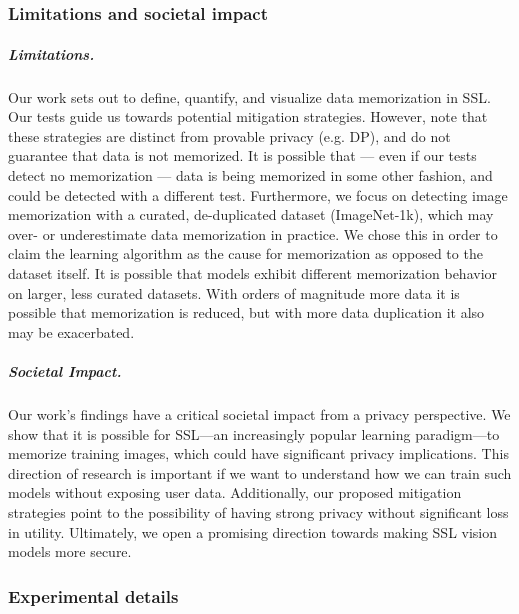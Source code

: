 \graphicspath{{./chapters/chapter1/}}
\chapter{ }
\subsection{Limitations and societal impact}
\paragraph{Limitations. }
Our work sets out to define, quantify, and visualize data memorization in SSL. Our tests guide us towards potential mitigation strategies. However, note that these strategies are distinct from provable privacy (e.g. DP), and do not guarantee that data is not memorized. It is possible that --- even if our tests detect no memorization --- data is being memorized in some other fashion, and could be detected with a different test. Furthermore, we focus on detecting image memorization with a curated, de-duplicated dataset (ImageNet-1k), which may over- or underestimate data memorization in practice. We chose this in order to claim the learning algorithm as the cause for memorization as opposed to the dataset itself. It is possible that models exhibit different memorization behavior on larger, less curated datasets. With orders of magnitude more data it is possible that memorization is reduced, but with more data duplication it also may be exacerbated. 

\paragraph{Societal Impact. }
Our work's findings have a critical societal impact from a privacy perspective. We show that it is possible for SSL---an increasingly popular learning paradigm---to memorize training images, which could have significant privacy implications. This direction of research is important if we want to understand how we can train such models without exposing user data. Additionally, our proposed mitigation strategies point to the possibility of having strong privacy without significant loss in utility. Ultimately, we open a promising direction towards making SSL vision models more secure.  

\subsection{Experimental details}

